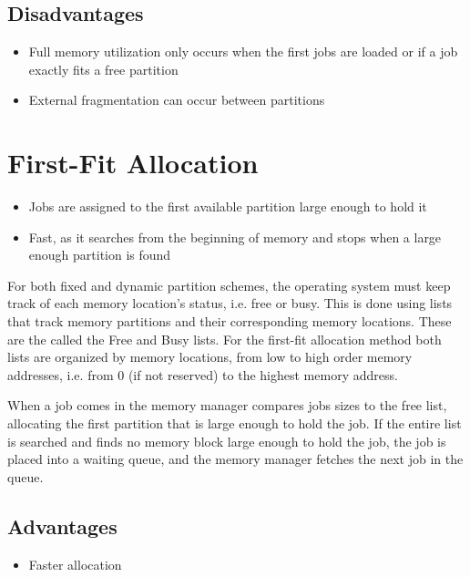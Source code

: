 \documentclass[12pt letter]{report}
\begin{document}
\subsection{Disadvantages}
\begin{itemize}
  \item Full memory utilization only occurs when the first jobs are loaded or if a job exactly fits a free partition
  \item External fragmentation can occur between partitions
\end{itemize}

\section{First-Fit Allocation}

\begin{itemize}
  \item Jobs are assigned to the first available partition large enough to hold it
  \item Fast, as it searches from the beginning of memory and stops when a large enough partition is found
\end{itemize}

For both fixed and dynamic partition schemes, the operating system must keep track of each memory location's status, i.e. free or busy. This is done using lists that track memory partitions and their corresponding memory locations. These are the called the Free and Busy lists. For the first-fit allocation method both lists are organized by memory locations, from low to high order memory addresses, i.e. from 0 (if not reserved) to the highest memory address.

When a job comes in the memory manager  compares jobs sizes to the free list, allocating the first partition that is large enough to hold the job. If the entire list is searched and finds no memory block large enough to hold the job, the job is placed into a waiting queue, and the memory manager fetches the next job in the queue.

\subsection{Advantages}
\begin{itemize}
  \item Faster allocation
\end{itemize}
\end{document}
